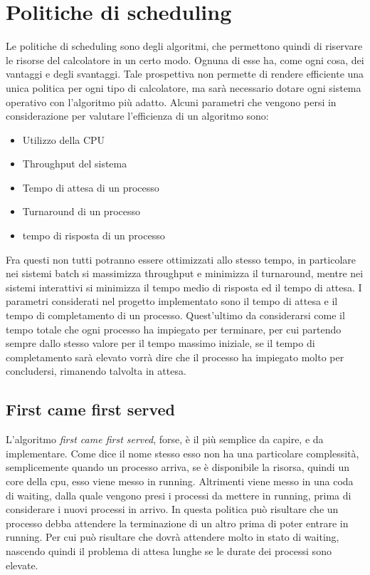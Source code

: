 \documentclass[Lau, oneside]{sapthesis}%
\begin{document}
\section{Politiche di scheduling}
\label{sec:politiche}
Le politiche di scheduling sono degli algoritmi, che permettono quindi di riservare le risorse del calcolatore in un certo modo.
Ognuna di esse ha, come ogni cosa, dei vantaggi e degli svantaggi.
Tale prospettiva non permette di rendere efficiente una unica politica per ogni tipo di calcolatore, ma sarà necessario dotare ogni sistema operativo con l'algoritmo più adatto.
Alcuni parametri che vengono persi in considerazione per valutare l'efficienza di un algoritmo sono:
\begin{itemize}
\item Utilizzo della CPU
\item Throughput del sistema
\item Tempo di attesa di un processo
\item Turnaround di un processo
\item tempo di risposta di un processo
\end{itemize}
Fra questi non tutti potranno essere ottimizzati allo stesso tempo, in particolare nei sistemi batch si massimizza throughput e minimizza il turnaround, mentre nei sistemi interattivi si minimizza il tempo medio di risposta ed il tempo di attesa.
I parametri considerati nel progetto implementato sono il tempo di attesa e il tempo di completamento di un processo.
Quest'ultimo da considerarsi come il tempo totale che ogni processo ha impiegato per terminare, per cui partendo sempre dallo stesso valore per il tempo massimo iniziale, se il tempo di completamento sarà elevato vorrà dire che il processo ha impiegato molto per concludersi, rimanendo talvolta in attesa.

\subsection{First came first served}
\label{ssec:fcfs}
L'algoritmo \textit{first came first served}, forse, è il più semplice da capire, e da implementare.
Come dice il nome stesso esso non ha una particolare complessità, semplicemente quando un processo arriva, se è disponibile la risorsa, quindi un core della cpu, esso viene messo in running.
Altrimenti viene messo in una coda di waiting, dalla quale vengono presi i processi da mettere in running, prima di considerare i nuovi processi in arrivo.
In questa politica può risultare che un processo debba attendere la terminazione di un altro prima di poter entrare in running.
Per cui può risultare che dovrà attendere molto in stato di waiting, nascendo quindi il problema di attesa lunghe se le durate dei processi sono elevate.
\end{document}
